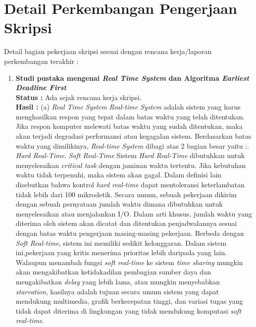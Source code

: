 \documentclass[a4paper,twoside]{article}
\begin{document}
\section{Detail Perkembangan Pengerjaan Skripsi}
Detail bagian pekerjaan skripsi sesuai dengan rencana kerja/laporan perkembangan terakhir :
	\begin{enumerate}
		\item \textbf{Studi pustaka mengenai {\it Real Time System }dan Algoritma {\it Earliest Deadline First}}\\
		{\bf Status :} Ada sejak rencana kerja skripsi.\\
		{\bf Hasil : \newline } 
		(a) {\it Real Time System}\newline
        {\it Real-time System} adalah sistem yang harus menghasilkan respon yang tepat dalam batas waktu yang telah ditentukan. Jika respon komputer melewati batas waktu yang sudah ditentukan, maka akan terjadi degradasi performansi atau kegagalan sistem. Berdasarkan batas waktu yang dimilikinya, {\it Real-time System} dibagi atas 2 bagian besar yaitu :. {\it Hard Real-Time}. {\it Soft Real-Time}\newline\newline
		Sistem {\it Hard Real-Time} dibutuhkan untuk menyelesaikan {\it critical task} dengan jaminan waktu tertentu. Jika kebutuhan waktu tidak terpenuhi, maka sistem akan gagal. Dalam definisi lain disebutkan bahwa kontrol {\it hard real-time} dapat mentoleransi keterlambatan tidak lebih dari 100 mikrodetik. Secara umum, sebuah pekerjaan dikirim dengan sebuah pernyataan jumlah waktu dimana dibutuhkan untuk menyelesaikan atau menjalankan I/O. Dalam arti khusus, jumlah waktu yang diterima oleh sistem akan dicatat dan ditentukan penjadwalannya sesuai dengan batas waktu pengerjaan masing-masing pekerjaan.\newline \newline
		Berbeda dengan {\it Soft Real-time}, sistem ini memiliki sedikit kelonggaran. Dalam sistem ini,pekerjaan yang kritis menerima prioritas lebih daripada yang lain. Walaupun menambah fungsi {\it soft real-time} ke sistem {\it time sharing} mungkin akan mengakibatkan ketidakadilan pembagian sumber daya dan mengakibatkan {\it delay} yang lebih lama, atau mungkin menyebabkan {\it starvation}, hasilnya adalah tujuan secara umum sistem yang dapat mendukung multimedia, grafik berkecepatan tinggi, dan variasi tugas yang tidak dapat diterima di lingkungan yang tidak mendukung komputasi {\it soft real-time}.
		\newline \newline \newpage
		

\end{enumerate}
\end{document}
